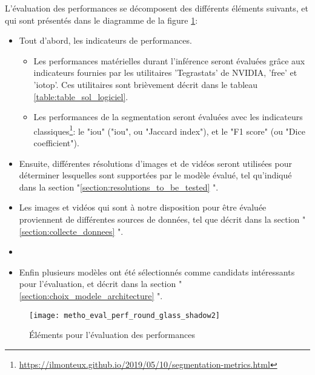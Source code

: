 ﻿L’évaluation des performances se décomposent des différents éléments suivants, et qui sont présentés dans le diagramme de la figure \ref{fig:metho_eval}: 
\begin{itemize}
    \item Tout d'abord, les indicateurs de performances.
    \begin{itemize}
        \item Les performances matérielles durant l'inférence seront évaluées grâce aux indicateurs fournies par les utilitaires 'Tegrastats' de NVIDIA, 'free' et 'iotop'. Ces utilitaires sont brièvement décrit dans le tableau \ref{table:table_sol_logiciel}.
        \item Les performances de la segmentation seront évaluées avec les indicateurs classiques\footnote{\url{https://ilmonteux.github.io/2019/05/10/segmentation-metrics.html}}: le "\acrshort{iou}" ("\acrlong{iou}", ou "Jaccard index"), et le "F1 score" (ou "Dice coefficient").
    \end{itemize}
    \item Ensuite, différentes résolutions d'images et de vidéos seront utilisées pour déterminer lesquelles sont supportées par le modèle évalué, tel qu'indiqué dans la section "\ref{section:resolutions_to_be_tested} ". 
    \item Les images et vidéos qui sont à notre disposition pour être évaluée proviennent de différentes sources de données, tel que décrit dans la section "\ref{section:collecte_donnees} ". 
    \item \item Enfin plusieurs modèles ont été sélectionnés comme candidats intéressants pour l'évaluation, et décrit dans la section "\ref{section:choix_modele_architecture} ".
\end{itemize} 
\label{metho_eval}
\begin{figure}[H]
    \centering
    \texttt{[image: metho\_eval\_perf\_round\_glass\_shadow2]}
    \caption{Éléments pour l'évaluation des performances}
    \label{fig:metho_eval}
\end{figure}
